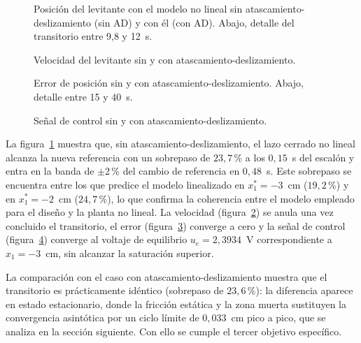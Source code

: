\begin{figure}[ht]
    \centering
    
    \caption[Sin AD: posición]{Posición del levitante con el modelo no lineal sin atascamiento-deslizamiento (sin AD) y con él (con AD). Abajo, detalle del transitorio entre 9,8 y 12~s.}
    \label{fig:sinad_pos}
\end{figure}

\begin{figure}[ht]
    \centering
    
    \caption[Sin AD: velocidad]{Velocidad del levitante sin y con atascamiento-deslizamiento.}
    \label{fig:sinad_vel}
\end{figure}

\begin{figure}[ht]
    \centering
    
    \caption[Sin AD: error]{Error de posición sin y con atascamiento-deslizamiento. Abajo, detalle entre 15 y 40~s.}
    \label{fig:sinad_error}
\end{figure}

\begin{figure}[ht]
    \centering
    
    \caption[Sin AD: señal de control]{Señal de control sin y con atascamiento-deslizamiento.}
    \label{fig:sinad_ctrl}
\end{figure}

La figura~\ref{fig:sinad_pos} muestra que, sin atascamiento-deslizamiento, el lazo cerrado no lineal alcanza la nueva referencia con un sobrepaso de $23{,}7$\,\% a los $0{,}15$~s del escalón y entra en la banda de $\pm 2$\,\% del cambio de referencia en $0{,}48$~s. Este sobrepaso se encuentra entre los que predice el modelo linealizado en $x_1^*=-3$~cm ($19{,}2$\,\%) y en $x_1^*=-2$~cm ($24{,}7$\,\%), lo que confirma la coherencia entre el modelo empleado para el diseño y la planta no lineal. La velocidad (figura~\ref{fig:sinad_vel}) se anula una vez concluido el transitorio, el error (figura~\ref{fig:sinad_error}) converge a cero y la señal de control (figura~\ref{fig:sinad_ctrl}) converge al voltaje de equilibrio $u_e=2{,}3934$~V correspondiente a $x_1=-3$~cm, sin alcanzar la saturación superior.

La comparación con el caso con atascamiento-deslizamiento muestra que el transitorio es prácticamente idéntico (sobrepaso de $23{,}6$\,\%): la diferencia aparece en estado estacionario, donde la fricción estática y la zona muerta sustituyen la convergencia asintótica por un ciclo límite de $0{,}033$~cm pico a pico, que se analiza en la sección siguiente. Con ello se cumple el tercer objetivo específico.

